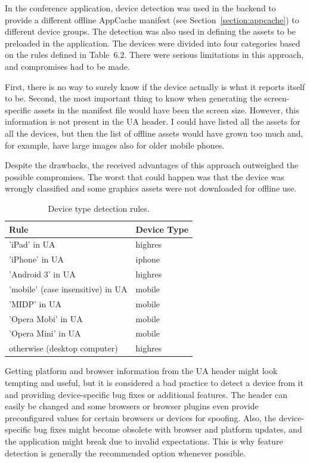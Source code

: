 In the conference application, device detection was used in the
backend to provide a different offline AppCache manifest (see
Section~\ref{section:appcache}) to different device groups. The
detection was also used in defining the assets to be preloaded in the
application. The devices were divided into four categories based on
the rules defined in Table~6.2\tableref. There were serious
limitations in this approach, and compromises had to be made.

First, there is no way to surely know if the device actually is what
it reports itself to be. Second, the most important thing to know when
generating the screen-specific assets in the manifest file would have
been the screen size. However, this information is not present in the
UA header. I could have listed all the assets for all the devices, but
then the list of offline assets would have grown too much and, for
example, have large images also for older mobile phones.

Despite the drawbacks, the received advantages of this approach
outweighed the possible compromises. The worst that could happen was
that the device was wrongly classified and some graphics assets were
not downloaded for offline use.

\begin{table}
  \begin{tabular}{ l | l }
    \textbf{Rule} & \textbf{Device Type} \\ \hline
    'iPad' in UA & highres \\
    'iPhone' in UA & iphone \\
    'Android 3' in UA & highres \\
    'mobile' (case insensitive) in UA & mobile \\
    'MIDP' in UA & mobile \\
    'Opera Mobi' in UA & mobile \\
    'Opera Mini' in UA & mobile \\
    otherwise (desktop computer) & highres
  \end{tabular}
  \label{table:device-detection-rules}
  \caption{Device type detection rules.}
\end{table}

Getting platform and browser information from the UA header might look
tempting and useful, but it is considered a bad practice to detect a
device from it and providing device-specific bug fixes or additional
features. The header can easily be changed and some browsers or
browser plugins even provide preconfigured values for certain browsers
or devices for spoofing. Also, the device-specific bug fixes might
become obsolete with browser and platform updates, and the application
might break due to invalid expectations. This is why feature detection
is generally the recommended option whenever possible.

